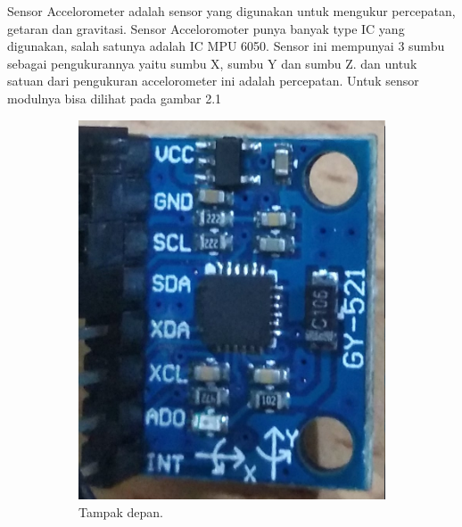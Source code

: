 \documentclass[11pt]{article}
\begin{document}
Sensor Accelorometer adalah sensor yang digunakan untuk mengukur percepatan, getaran dan gravitasi.
Sensor Acceloromoter punya banyak type IC yang digunakan, salah satunya adalah IC MPU 6050.
Sensor ini mempunyai 3 sumbu sebagai pengukurannya yaitu sumbu X, sumbu Y dan sumbu Z.
dan untuk satuan dari pengukuran accelorometer ini adalah percepatan.
Untuk sensor modulnya bisa dilihat pada gambar 2.1
\begin{figure}[h!]
	\centering
	\begin{subfigure}[b]{0.4\linewidth}
		\includegraphics[width=\linewidth]{dokumentasi/MPU6050/mpu6050.jpg}
		\caption{Tampak depan.}
	\end{subfigure}
	\begin{subfigure}[b]{0.35\linewidth}

\end{subfigure}
\end{figure}
\end{document}
